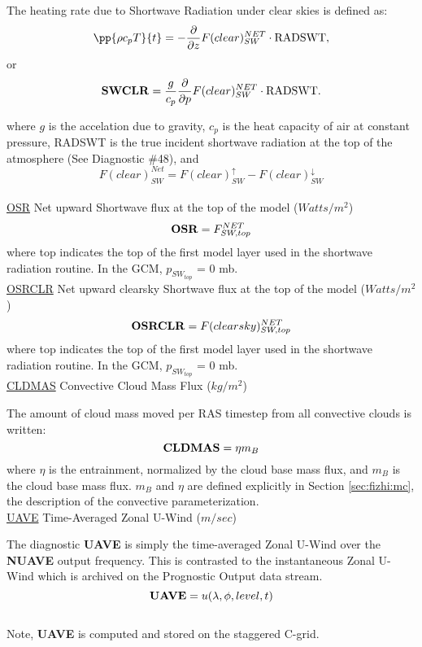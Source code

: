 \noindent
The heating rate due to Shortwave Radiation under clear skies is defined as:
\[
\pp{\rho c_p T}{t} = - {\partial \over \partial z} F(clear)_{SW}^{NET} \cdot {\rm RADSWT},
\]
or
\[
{\bf SWCLR} = \frac{g}{c_p } {\partial \over \partial p} F(clear)_{SW}^{NET}\cdot {\rm RADSWT} .
\]

\noindent
where $g$ is the accelation due to gravity,
$c_p$ is the heat capacity of air at constant pressure, RADSWT is the true incident
shortwave radiation at the top of the atmosphere (See Diagnostic \#48), and
\[
F(clear)_{SW}^{Net} = F(clear)_{SW}^\uparrow - F(clear)_{SW}^\downarrow
\]
\\

\noindent
{ \underline {OSR} Net upward Shortwave flux at the top of the model ($Watts/m^2$) }
\[
{\bf OSR}  =  F_{SW,top}^{NET}
\]                                                                                       
\noindent
where top indicates the top of the first model layer used in the shortwave radiation
routine.
In the GCM, $p_{SW_{top}}$ = 0 mb.
\\

\noindent
{ \underline {OSRCLR} Net upward clearsky Shortwave flux at the top of the model ($Watts/m^2$) }
\[
{\bf OSRCLR}  =  F(clearsky)_{SW,top}^{NET}
\]
\noindent
where top indicates the top of the first model layer used in the shortwave radiation
routine.
In the GCM, $p_{SW_{top}}$ = 0 mb.
\\


\noindent
{ \underline {CLDMAS} Convective Cloud Mass Flux ($kg/m^2$) } 

\noindent
The amount of cloud mass moved per RAS timestep from all convective clouds is written:
\[
{\bf CLDMAS} = \eta m_B
\]
where $\eta$ is the entrainment, normalized by the cloud base mass flux, and $m_B$ is
the cloud base mass flux. $m_B$ and $\eta$ are defined explicitly in Section \ref{sec:fizhi:mc}, the 
description of the convective parameterization.
\\



\noindent
{ \underline {UAVE} Time-Averaged Zonal U-Wind ($m/sec$) }

\noindent
The diagnostic {\bf UAVE} is simply the time-averaged Zonal U-Wind over
the {\bf NUAVE} output frequency.  This is contrasted to the instantaneous
Zonal U-Wind which is archived on the Prognostic Output data stream.
\[
{\bf UAVE} = u(\lambda, \phi, level , t)
\]
\\
Note, {\bf UAVE} is computed and stored on the staggered C-grid.
\\


